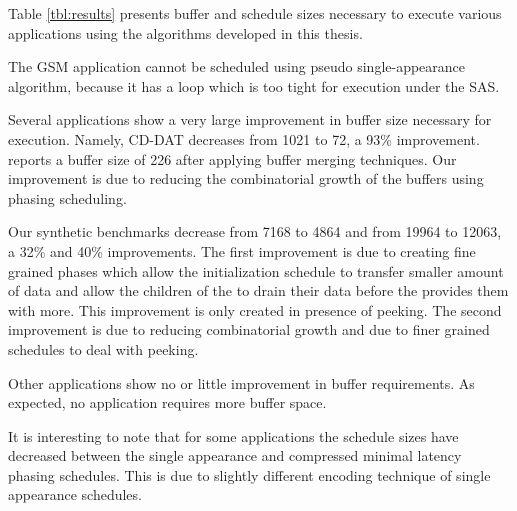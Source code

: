 Table \ref{tbl:results} presents buffer and schedule sizes
necessary to execute various applications using the algorithms
developed in this thesis.

The GSM application cannot be scheduled using pseudo
single-appearance algorithm, because it has a loop which is too
tight for execution under the SAS.

Several applications show a very large improvement in buffer size
necessary for execution.  Namely, CD-DAT decreases from 1021 to
72, a 93\% improvement. \cite{murthy99buffer} reports a buffer
size of 226 after applying buffer merging techniques. Our
improvement is due to reducing the combinatorial growth of the
buffers using phasing scheduling.

Our synthetic benchmarks decrease from 7168 to 4864 and from 19964
to 12063, a 32\% and 40\% improvements. The first improvement is
due to creating fine grained phases which allow the initialization
schedule to transfer smaller amount of data and allow the children
of the {\splitjoin} to drain their data before the {\splitter}
provides them with more. This improvement is only created in
presence of peeking. The second improvement is due to reducing
combinatorial growth and due to finer grained schedules to deal
with peeking.

Other applications show no or little improvement in buffer
requirements. As expected, no application requires more buffer
space.

It is interesting to note that for some applications the schedule
sizes have decreased between the single appearance and compressed
minimal latency phasing schedules. This is due to slightly
different encoding technique of single appearance schedules.
